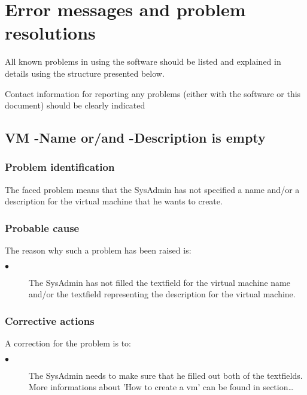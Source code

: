 
\chapter{Error messages and problem resolutions}
\label{chap:error_messages}

All known problems in using the software should be listed and explained in
details using the structure presented below.

Contact information for reporting any problems (either with the software or
this document) should be clearly indicated




\section{VM -Name or/and -Description is empty} 

\subsection{Problem identification}
The faced problem means that the SysAdmin has not specified a name and/or a
description for the virtual machine that he wants to create.

\subsection{Probable cause}

The reason why such a problem has been raised is:\\
\begin{description}
\item[$\bullet$] The SysAdmin has not filled the textfield for the virtual
machine name and/or the textfield representing the description for the virtual
machine.
\end{description}


\subsection{Corrective actions}

A correction for the problem is to:\\
\begin{description}
\item[$\bullet$] The SysAdmin needs to make sure that he filled out both of
the textfields.  More informations about 'How to create a vm' can be found in
section\ldots

\end{description}





